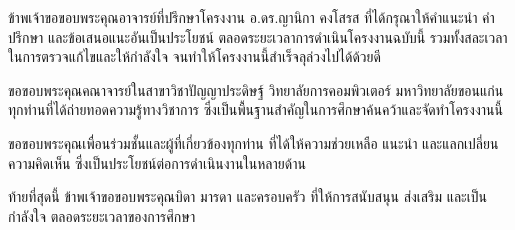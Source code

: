 ข้าพเจ้าขอขอบพระคุณอาจารย์ที่ปรึกษาโครงงาน อ.ดร.ญานิกา คงโสรส
ที่ได้กรุณาให้คำแนะนำ คำปรึกษา และข้อเสนอแนะอันเป็นประโยชน์
ตลอดระยะเวลาการดำเนินโครงงานฉบับนี้
รวมทั้งสละเวลาในการตรวจแก้ไขและให้กำลังใจ
จนทำให้โครงงานนี้สำเร็จลุล่วงไปได้ด้วยดี

ขอขอบพระคุณคณาจารย์ในสาขาวิชาปัญญาประดิษฐ์
วิทยาลัยการคอมพิวเตอร์ มหาวิทยาลัยขอนแก่น
ทุกท่านที่ได้ถ่ายทอดความรู้ทางวิชาการ
ซึ่งเป็นพื้นฐานสำคัญในการศึกษาค้นคว้าและจัดทำโครงงานนี้

ขอขอบพระคุณเพื่อนร่วมชั้นและผู้ที่เกี่ยวข้องทุกท่าน
ที่ได้ให้ความช่วยเหลือ แนะนำ และแลกเปลี่ยนความคิดเห็น
ซึ่งเป็นประโยชน์ต่อการดำเนินงานในหลายด้าน

ท้ายที่สุดนี้ ข้าพเจ้าขอขอบพระคุณบิดา มารดา และครอบครัว
ที่ให้การสนับสนุน ส่งเสริม และเป็นกำลังใจ
ตลอดระยะเวลาของการศึกษา